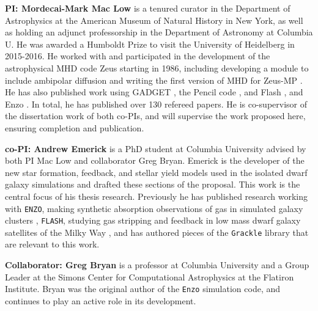 \documentclass[11pt]{article}
\begin{document}
\textbf{PI: Mordecai-Mark Mac Low}  is a tenured curator in the Department of Astrophysics at the American
Museum of Natural History in New York, as well as holding an adjunct professorship in the Department of 
Astronomy at Columbia U.  He was awarded a Humboldt Prize to visit the University of Heidelberg in 2015-2016.
He worked with and participated in the
development of the astrophysical MHD code Zeus starting in 1986, including
developing a module to include ambipolar diffusion
\citep{MacLow1995,MacLowSmith1997} and writing the first version of MHD
for Zeus-MP 
\citep{Hayes2006}.  He has also published work using GADGET 
\citep{Li2005,Li2005a,Li2006},
the Pencil code 
\citep{Oishi2007,Johansen2007,Johansen2009,Yang2009,OishiMacLow2009,McNally2014}, and
Flash 
\citep{Joung2006,Joung2009,Peters2010,Peters2010a,Peters2010b,Peters2011,Peters2012,Hill2012,Gatto2015,Girichidis2016SImulatingOutflows,Ibanez-Mejia2016}, and Enzo \citep{Simpson2013}.
In
total, he has published over 130 refereed papers. He is co-supervisor of the dissertation work of both co-PIs, and
will supervise the work proposed here, ensuring completion and publication.

\textbf{co-PI: Andrew Emerick} is a PhD student at Columbia University advised by both PI Mac Low and collaborator Greg Bryan. Emerick is the developer of the new star formation, feedback, and stellar yield models used in the isolated dwarf galaxy simulations and drafted these sections of the proposal. This work is the central focus of his thesis research. Previously he has published research working with \texttt{ENZO}, making synthetic absorption observations of gas in simulated galaxy clusters \citep{Emerick2015}, \texttt{FLASH}, studying gas stripping and feedback in low mass dwarf galaxy satellites of the Milky Way \citep{Emerick2016}, and has authored pieces of the \texttt{Grackle} library \citep{Grackle} that are relevant to this work.

\textbf{Collaborator: Greg Bryan} is a professor at Columbia University and a Group Leader at the Simons Center for Computational Astrophysics at the Flatiron Institute. Bryan was the original author of the \texttt{Enzo} simulation code, and continues to play an active role in its development. %
\end{document}
